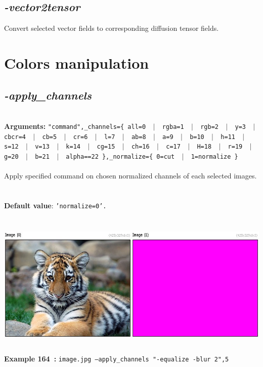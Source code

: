 \documentclass[a4paper,11pt,twoside]{book}
\begin{document}
\subsection{\emph{-vector2tensor} }\vspace*{-0.5em}
Convert selected vector fields to corresponding diffusion tensor fields.

\section{Colors manipulation}


\subsection{\emph{-apply\_channels} }\vspace*{-0.5em}
~\\\textbf{Arguments: } 
{\small \texttt{"command",\_channels=\{ all=0 ~$|$~ rgba=1 ~$|$~ rgb=2 ~$|$~ y=3 ~$|$~ cbcr=4 ~$|$~ cb=5 ~$|$~ cr=6 ~$|$~ l=7 ~$|$~ ab=8 ~$|$~ a=9 ~$|$~ b=10 ~$|$~ h=11 ~$|$~ s=12 ~$|$~ v=13 ~$|$~ k=14 ~$|$~ cg=15 ~$|$~ ch=16 ~$|$~ c=17 ~$|$~ H=18 ~$|$~ r=19 ~$|$~ g=20 ~$|$~ b=21 ~$|$~ alpha==22 \},\_normalize=\{ 0=cut ~$|$~ 1=normalize \}}}\\~\\
Apply specified command on chosen normalized channels of each selected images.
~\\~\\\textbf{Default value}: {\small \texttt{'normalize=0'.}}
\begin{center}\includegraphics[keepaspectratio=true,height=7cm,width=\textwidth]{img/gmic_def164.jpg}\\
{\footnotesize \textbf{Example 164~:} \texttt{image.jpg --apply\_channels "-equalize -blur 2",5}}
\end{center}
\end{document}
